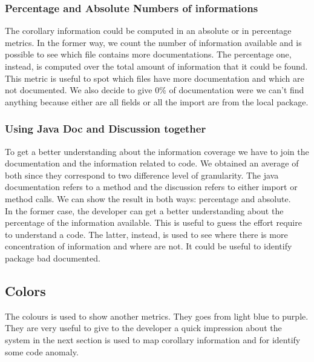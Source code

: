 \documentclass[]{usiinfbachelorproject}
\begin{document}
\subsubsection{Percentage and Absolute Numbers of informations}
The corollary information could be computed in an absolute or in percentage metrics. In the former way, we count the number of information available and is possible to see which file contains more documentations. The percentage one, instead, is computed over the total amount of information that it could be found. This metric is useful to spot which files have more documentation and which are not documented. We also decide to give 0\% of documentation were we can't find anything because either are all fields or all the import are from the local package.

\subsubsection{Using Java Doc and Discussion together}
To get a better understanding about the information coverage we have to join the documentation and the information related to code. We obtained an average of both since they correspond to two difference level of granularity. The java documentation refers to a method and the discussion refers to either import or method calls. We can show the result in both ways: percentage and absolute.\\
In the former case, the developer can get a better understanding about the percentage of the information available. This is useful to guess the effort require to understand a code. The latter, instead, is used to see where there is more concentration of information and where are not. It could be useful to identify package bad documented.

  

\newpage

\subsection{Colors}
The colours is used to show another metrics. They goes from light blue to purple. They are very useful to give to the developer a quick impression about the system  in the next section is used to map corollary information and for identify some code anomaly.
\end{document}
